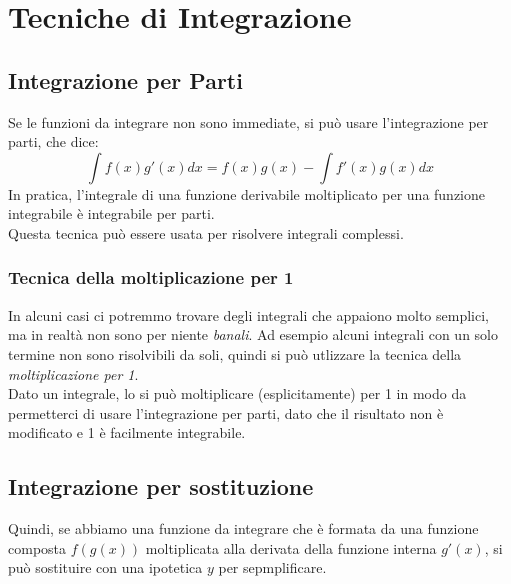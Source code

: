 \documentclass[12pt, a4paper, openany]{book}
\begin{document}
\section{Tecniche di Integrazione}

\subsection{Integrazione per Parti}
Se le funzioni da integrare non sono immediate, si può usare l'integrazione per parti, che dice:
$$\int f(x) g'(x) dx = f(x)g(x) - \int f'(x)g(x) dx$$
In pratica, l'integrale di una funzione derivabile moltiplicato per una funzione integrabile è integrabile per parti.
\\Questa tecnica può essere usata per risolvere integrali complessi.
\subsubsection*{Tecnica della moltiplicazione per 1}
In alcuni casi ci potremmo trovare degli integrali che appaiono molto semplici, ma in realtà non sono per niente \emph{banali}.
Ad esempio alcuni integrali con un solo termine non sono risolvibili da soli, quindi si può utlizzare la tecnica della \emph{moltiplicazione per 1}.
\\Dato un integrale, lo si può moltiplicare (esplicitamente) per 1 in modo da permetterci di usare l'integrazione per parti, dato che il risultato non è modificato e 1 è facilmente integrabile.


\subsection{Integrazione per sostituzione}
Quindi, se abbiamo una funzione da integrare che è formata da una funzione composta $f(g(x))$ moltiplicata alla derivata della funzione interna $g'(x)$,
si può sostituire con una ipotetica $y$ per sepmplificare.
\end{document}
